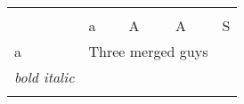 \documentclass{article}
\begin{document}
	\begin{table}
		\begin{tabular}{@{} l l l l l @{}}
			  &  &  &  &  &  \\

			  & a & A & A & S &  \\

			 a & \multicolumn{3}{l}{Three merged guys} & \color{FF0000} &
			\color{FF0000} \\

			 \emph{bold italic} &  &  &  &  &  \\

			\hline  &  &  &  &  &  \\


		\end{tabular}
	\end{table}
\end{document}
